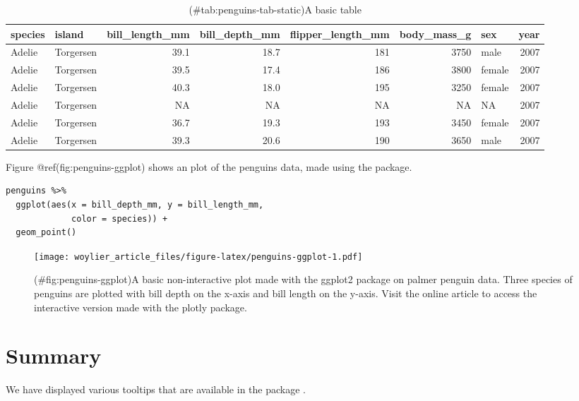 \begin{table}

\caption{(\#tab:penguins-tab-static)A basic table}
\centering
\fontsize{7}{9}\selectfont
\begin{tabular}[t]{l|l|r|r|r|r|l|r}
\hline
species & island & bill\_length\_mm & bill\_depth\_mm & flipper\_length\_mm & body\_mass\_g & sex & year\\
\hline
Adelie & Torgersen & 39.1 & 18.7 & 181 & 3750 & male & 2007\\
\hline
Adelie & Torgersen & 39.5 & 17.4 & 186 & 3800 & female & 2007\\
\hline
Adelie & Torgersen & 40.3 & 18.0 & 195 & 3250 & female & 2007\\
\hline
Adelie & Torgersen & NA & NA & NA & NA & NA & 2007\\
\hline
Adelie & Torgersen & 36.7 & 19.3 & 193 & 3450 & female & 2007\\
\hline
Adelie & Torgersen & 39.3 & 20.6 & 190 & 3650 & male & 2007\\
\hline
\end{tabular}
\end{table}

Figure @ref(fig:penguins-ggplot) shows an plot of the penguins data, made using the  package.

\begin{verbatim}
penguins %>% 
  ggplot(aes(x = bill_depth_mm, y = bill_length_mm, 
             color = species)) + 
  geom_point()
\end{verbatim}

\begin{figure}
\centering
\texttt{[image: woylier\_article\_files/figure-latex/penguins-ggplot-1.pdf]}
\caption{(\#fig:penguins-ggplot)A basic non-interactive plot made with the ggplot2 package on palmer penguin data. Three species of penguins are plotted with bill depth on the x-axis and bill length on the y-axis. Visit the online article to access the interactive version made with the plotly package.}
\end{figure}

\hypertarget{summary}{%
\section{Summary}\label{summary}}

We have displayed various tooltips that are available in the package .

